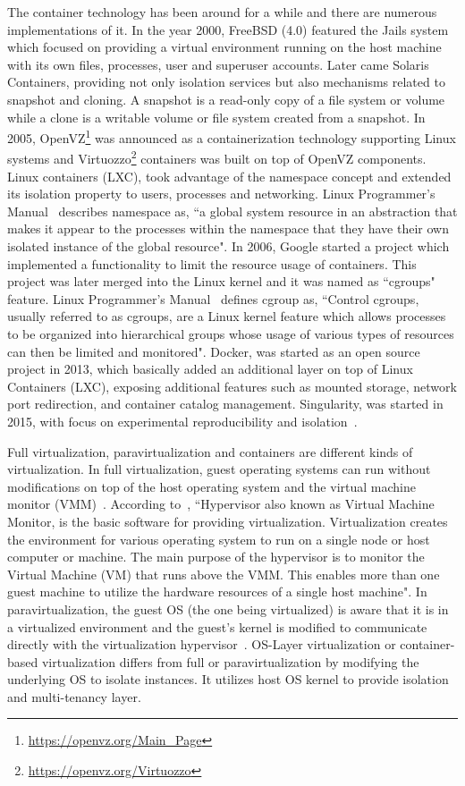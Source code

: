The container technology has been around for a while and there are numerous implementations of it. In the year 2000, FreeBSD (4.0) featured the Jails system which focused on providing a virtual environment running on the host machine with its own files, processes, user and superuser accounts. Later came Solaris Containers, providing not only isolation services but also mechanisms related to snapshot and cloning. A snapshot is a read-only copy of a file system or volume while a clone is a writable volume or file system created from a snapshot. In 2005, OpenVZ\footnote{\url{https://openvz.org/Main_Page}} was announced as a containerization technology supporting Linux systems and Virtuozzo\footnote{\url{https://openvz.org/Virtuozzo}} containers was built on top of OpenVZ components. Linux containers (LXC), took advantage of the namespace concept and extended its isolation property to users, processes and networking. Linux Programmer's Manual~\cite{namespaces} describes namespace as, ``a global system resource in an abstraction that makes it appear to the processes within the namespace that they have their own isolated instance of the global resource". In 2006, Google started a project which implemented a functionality to limit the resource usage of containers. This project was later merged into the Linux kernel and it was named as ``cgroups" feature. Linux Programmer's Manual~\cite{cgroups} defines cgroup as, ``Control cgroups, usually referred to as cgroups, are a Linux kernel feature which allows processes to be organized into hierarchical groups whose usage of various types of resources can then be limited and monitored". Docker, was started as an open source project in 2013, which basically added an additional layer on top of Linux Containers (LXC), exposing additional features such as mounted storage, network port redirection, and container catalog management. Singularity, was started in 2015, with focus on experimental reproducibility and isolation~\cite{Xavier:2013:PEC:2497369.2497577}.

Full virtualization, paravirtualization and containers are different kinds of virtualization. In full virtualization, guest operating systems can run without modifications on top of the host operating system and the virtual machine monitor (VMM)~\cite{7382987}. According to~\cite{hypervisor}, ``Hypervisor also known as Virtual Machine Monitor, is the basic software for providing virtualization. Virtualization creates the environment for various operating system to run on a single node or host computer or machine. The main purpose of the hypervisor is to monitor the Virtual Machine (VM) that runs above the VMM. This enables more than one guest machine to utilize the hardware resources of a single host machine". In paravirtualization, the guest OS (the one being virtualized) is aware that it is in a virtualized environment and the guest's kernel is modified to communicate directly with the virtualization hypervisor~\cite{7382987}. OS-Layer virtualization or container-based virtualization differs from full or paravirtualization by modifying the underlying OS to isolate instances. It utilizes host OS kernel to provide isolation and multi-tenancy layer.

